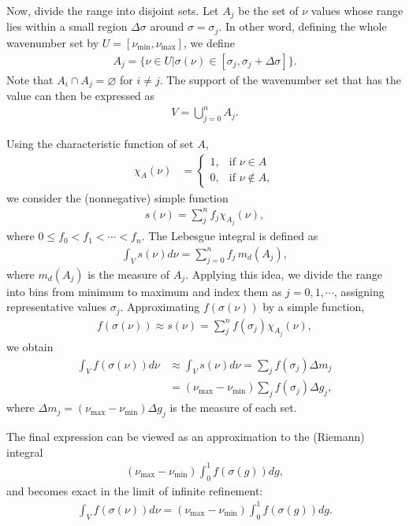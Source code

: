 Now, divide the range into disjoint sets.  
Let $A_j$ be the set of $\nu$ values whose range lies within a small region $\Delta \sigma$ around $\sigma = \sigma_j$.  In other word, defining the whole wavenumber set by $U = [\nu_\mathrm
{min}, \nu_\mathrm{max}]$, we define
\begin{align}
A_j = \{ \nu \in U | \sigma(\nu) \in [\sigma_j, \sigma_j + \Delta \sigma] \}.
\end{align}
Note that $A_i \cap A_j = \varnothing$ for $i \ne j$. The support of the wavenumber set that has the value can then be expressed as
\begin{align}
    V = \bigcup_{j=0}^{n} A_j.
\end{align}

Using the characteristic function of set $A$,
\begin{align}
   \chi_A (\nu) &= \begin{cases}
  1, & \text{if } \nu \in A \\
  0, & \text{if } \nu \notin A,
\end{cases}
\end{align}
we consider the (nonnegative) simple function
\begin{align}
    s(\nu) = \sum_j^n f_j \chi_{A_j}(\nu),
\end{align}
where $0 \leq f_0 < f_1 < \cdots < f_n$.  
The Lebesgue integral is defined as
\begin{align}
    \int_V s(\nu) d \nu = \sum_{j=0}^n f_j \, m_d (A_j),
\end{align}
where $m_d(A_j)$ is the measure of $A_j$.  
Applying this idea, we divide the range into bins from minimum to maximum and index them as $j=0,1,\cdots$, assigning representative values $\sigma_j$.  
Approximating $f(\sigma(\nu))$ by a simple function,
\begin{align}
    f(\sigma(\nu)) \approx s(\nu) = \sum_j^n f(\sigma_j) \chi_{A_j}(\nu),
\end{align}
we obtain
\begin{align}
 \int_V f(\sigma(\nu)) d \nu &\approx \int_V s(\nu) d \nu = \sum_j f(\sigma_j) \Delta m_j \\
 &= (\nu_\mathrm{max} - \nu_\mathrm{min}) \sum_j f(\sigma_j) \Delta g_j,
\end{align}
where $\Delta m_j = (\nu_\mathrm{max} - \nu_\mathrm{min}) \Delta g_j$ is the measure of each set.  

The final expression can be viewed as an approximation to the (Riemann) integral
\begin{align}
(\nu_\mathrm{max} - \nu_\mathrm{min}) \int_0^1 f(\sigma(g)) dg,
\end{align}
and becomes exact in the limit of infinite refinement:
\begin{align}
\label{eq:Lebesgue}
\int_V f(\sigma(\nu)) d \nu = (\nu_\mathrm{max} - \nu_\mathrm{min}) \int_0^1 f(\sigma(g)) dg.
\end{align}

